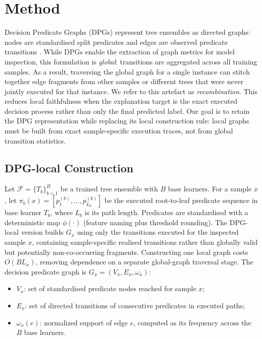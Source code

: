 \documentclass[runningheads]{llncs}
\begin{document}
\section{Method}


Decision Predicate Graphs (DPGs) represent tree ensembles as directed graphs: nodes are standardised split predicates and edges are observed predicate transitions \cite{arrighi2024decision,ceschin2025extending}. While DPGs enable the extraction of graph metrics for model inspection, this formulation is \emph{global}: transitions are aggregated across all training samples. As a result, traversing the global graph for a single instance can stitch together edge fragments from other samples or different trees that were never jointly executed for that instance. We refer to this artefact as \emph{recombination}. This reduces local faithfulness when the explanation target is the exact executed decision process rather than only the final predicted label. Our goal is to retain the DPG representation while replacing its local construction rule: local graphs must be built from exact sample-specific execution traces, not from global transition statistics.

\subsection{DPG-local Construction}
\label{sec:dpg-construction}

Let $\mathcal{F}=\{T_b\}_{b=1}^B$ be a trained tree ensemble with $B$ base learners. For a sample $x$, let $\pi_b(x)=[p^{(b)}_1,\dots,p^{(b)}_{L_b}]$ be the executed root-to-leaf predicate sequence in base learner $T_b$, where $L_b$ is its path length. Predicates are standardised with a deterministic map $\phi(\cdot)$ (feature naming plus threshold rounding).
The DPG-local version builds $G_x$ using only the transitions executed for the inspected sample $x$, containing sample-specific realised transitions rather than globally valid but potentially non-co-occurring fragments. Constructing one local graph costs $O(BL_x)$, removing dependence on a separate global-graph traversal stage. The decision predicate graph is $G_x=(V_x,E_x,\omega_x)$:
\begin{itemize}
  \item $V_x$: set of standardised predicate nodes reached for sample $x$;
  \item $E_x$: set of directed transitions of consecutive predicates in executed paths;
  \item $\omega_x(e)$: normalized support of edge $e$, computed as its frequency across the $B$ base learners.
\end{itemize}
\end{document}
